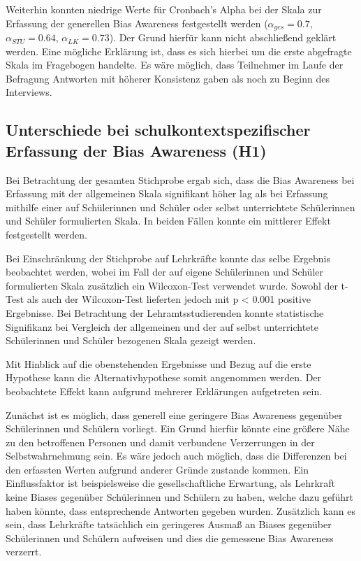 Weiterhin konnten niedrige Werte für Cronbach's Alpha bei der Skala zur Erfassung der generellen Bias Awareness festgestellt werden ($\alpha_{ges} = 0.7$, $\alpha_{STU} = 0.64$, $\alpha_{LK} = 0.73$).
Der Grund hierfür kann nicht abschließend geklärt werden.
Eine mögliche Erklärung ist, dass es sich hierbei um die erste abgefragte Skala im Fragebogen handelte.
Es wäre möglich, dass Teilnehmer im Laufe der Befragung Antworten mit höherer Konsistenz gaben als noch zu Beginn des Interviews.

\subsection{Unterschiede bei schulkontextspezifischer Erfassung der Bias Awareness (H1)}
\label{subsec:diskussion-h1}

Bei Betrachtung der gesamten Stichprobe ergab sich, dass die Bias Awareness bei Erfassung mit der allgemeinen Skala signifikant höher lag als bei Erfassung mithilfe einer auf Schülerinnen und Schüler oder selbst unterrichtete Schülerinnen und Schüler formulierten Skala.
In beiden Fällen konnte ein mittlerer Effekt festgestellt werden.

Bei Einschränkung der Stichprobe auf Lehrkräfte konnte das selbe Ergebnis beobachtet werden, wobei im Fall der auf eigene Schülerinnen und Schüler formulierten Skala zusätzlich ein Wilcoxon-Test verwendet wurde.
Sowohl der t-Test als auch der Wilcoxon-Test lieferten jedoch mit p < 0.001 positive Ergebnisse.
Bei Betrachtung der Lehramtsstudierenden konnte statistische Signifikanz bei Vergleich der allgemeinen und der auf selbst unterrichtete Schülerinnen und Schüler bezogenen Skala gezeigt werden. 

Mit Hinblick auf die obenstehenden Ergebnisse und Bezug auf die erste Hypothese kann die Alternativhypothese somit angenommen werden.
Der beobachtete Effekt kann aufgrund mehrerer Erklärungen aufgetreten sein.

Zunächst ist es möglich, dass generell eine geringere Bias Awareness gegenüber Schülerinnen und Schülern vorliegt.
Ein Grund hierfür könnte eine größere Nähe zu den betroffenen Personen und damit verbundene Verzerrungen in der Selbstwahrnehmung sein.
Es wäre jedoch auch möglich, dass die Differenzen bei den erfassten Werten aufgrund anderer Gründe zustande kommen.
Ein Einflussfaktor ist beispielsweise die gesellschaftliche Erwartung, als Lehrkraft keine Biases gegenüber Schülerinnen und Schülern zu haben, welche dazu geführt haben könnte, dass entsprechende Antworten gegeben wurden.
Zusätzlich kann es sein, dass Lehrkräfte tatsächlich ein geringeres Ausmaß an Biases gegenüber Schülerinnen und Schülern aufweisen und dies die gemessene Bias Awareness verzerrt.

